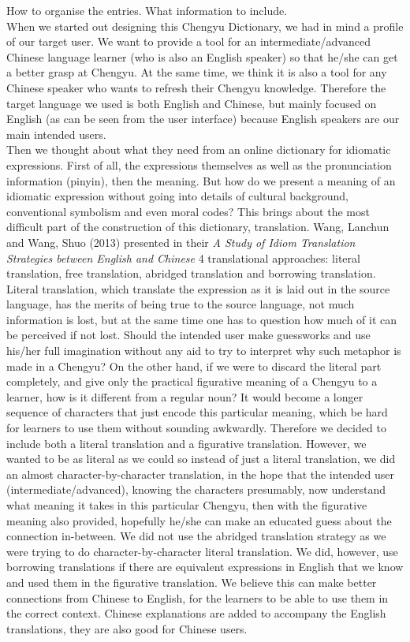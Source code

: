 \documentclass[11pt]{article} %
\begin{document}
\indent How to organise the entries. What information to include. \\

\indent When we started out designing this Chengyu Dictionary, we had in mind a profile of our target user. We want to provide a tool for an intermediate/advanced Chinese language learner (who is also an English speaker) so that he/she can get a better grasp at Chengyu. At the same time, we think it is also a tool for any Chinese speaker who wants to refresh their Chengyu knowledge. Therefore the target language we used is both English and Chinese, but mainly focused on English (as can be seen from the user interface) because English speakers are our main intended users.\\
Then we thought about what they need from an online dictionary for idiomatic expressions. First of all, the expressions themselves as well as the pronunciation information (pinyin), then the meaning. But how do we present a meaning of an idiomatic expression without going into details of cultural background, conventional symbolism and even moral codes? This brings about the most difficult part of the construction of this dictionary, translation. Wang, Lanchun and Wang, Shuo (2013) presented in their \textit{A Study of Idiom Translation Strategies between English and Chinese} 4 translational approaches: literal translation, free translation, abridged translation and borrowing translation. Literal translation, which translate the expression as it is laid out in the source language, has the merits of being true to the source language, not much information is lost, but at the same time one has to question how much of it can be perceived if not lost. Should the intended user make guessworks and use his/her full imagination without any aid to try to interpret why such metaphor is made in a Chengyu? On the other hand, if we were to discard the literal part completely, and give only the practical figurative meaning of a Chengyu to a learner, how is it different from a regular noun? It would become a longer sequence of characters  that just encode this particular meaning, which be hard for learners to use them without sounding awkwardly. Therefore we decided to include both a literal translation and a figurative translation. However, we wanted to be as literal as we could so instead of just a literal translation, we did an almost character-by-character translation, in the hope that the intended user (intermediate/advanced), knowing the characters presumably, now understand what meaning it takes in this particular Chengyu, then with the figurative meaning also provided, hopefully he/she can make an educated guess about the connection in-between. We did not use the abridged translation strategy as we were trying to do character-by-character literal translation. We did, however, use borrowing translations if there are equivalent expressions in English that we know and used them in the figurative translation. We believe this can make better connections from Chinese to English, for the learners to be able to use them in the correct context. Chinese explanations are added to accompany the English translations, they are also good for Chinese users.\\
\end{document}
